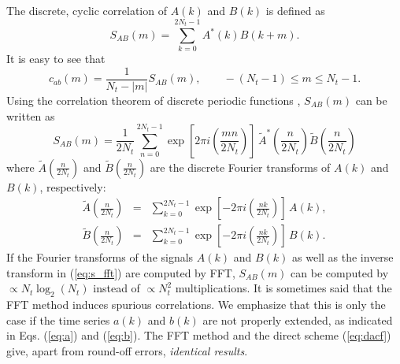 \documentclass[a4paper,11pt]{article}
\begin{document}
\begin{appendices}
\begin{equation}
\end{equation}
The discrete, cyclic correlation of $A(k)$ and $B(k)$ is defined as
\begin{equation}
\label{eq:s}
S_{AB}(m) = \sum\limits_{k=0}^{2N_t-1} A^*(k)B(k+m).
\end{equation}
It is easy to see that
\begin{equation}
\label{eq:c-s}
c_{ab}(m) = \frac{1}{N_t-|m|}S_{AB}(m),\qquad -(N_t-1) \le m \le N_t-1.
\end{equation}
Using the correlation theorem of discrete periodic functions
\cite{Brigham}, $S_{AB}(m)$ can be written as
\begin{equation}
\label{eq:s_fft}
S_{AB}(m) = \frac{1}{2N_t}\sum\limits_{n=0}^{2N_t-1}
\exp\left[2\pi i\left(\frac{mn}{2N_t}\right)\right]\,
\tilde A^*\left(\frac{n}{2N_t}\right)\tilde B\left(\frac{n}{2N_t}\right)
\end{equation}
where $\tilde A\left(\frac{n}{2N_t}\right)$ and $\tilde
B\left(\frac{n}{2N_t}\right)$ are the discrete  Fourier transforms of
$A(k)$ and $B(k)$, respectively:
\begin{eqnarray}
\tilde A\left(\frac{n}{2N_t}\right) &=
&\sum\limits_{k=0}^{2N_t-1} \exp\left[-2\pi i\left(\frac{n k}{2N_t}\right)\right]
\,A(k),\\
\tilde B\left(\frac{n}{2N_t}\right) &=
&\sum\limits_{k=0}^{2N_t-1} \exp\left[-2\pi i\left(\frac{n k}{2N_t}\right)\right]
\,B(k).
\end{eqnarray}
If the Fourier transforms of the signals $A(k)$ and $B(k)$ as well as
the inverse transform in (\ref{eq:s_fft}) are computed by \gls{FFT},
$S_{AB}(m)$ can be computed by $\propto N_t\log_2(N_t)$ instead of
$\propto N_t^2$ multiplications. It is sometimes said that the \gls{FFT}
method induces spurious correlations. We emphasize that this is only
the case if the time series $a(k)$ and $b(k)$ are not properly
extended, as indicated in Eqs. (\ref{eq:a}) and (\ref{eq:b}). The \gls{FFT}
method and the direct scheme (\ref{eq:dacf}) give, apart from
round-off errors, \textit{identical results}.


\end{appendices}
\end{document}
